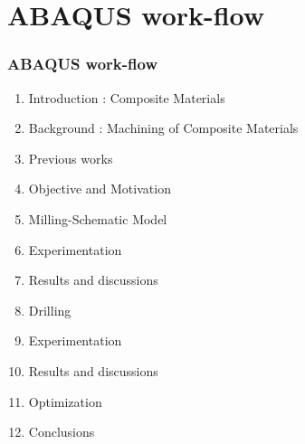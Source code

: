 \section{ABAQUS work-flow}
\begin{frame}
	\frametitle{ABAQUS work-flow}
	\begin{enumerate}
		\item Introduction : Composite Materials
		\item Background : Machining of Composite Materials
		\item Previous works
		\item Objective and Motivation
		\item Milling-Schematic Model
		\item Experimentation
		\item Results and discussions
		\item Drilling
		\item Experimentation
		\item Results and discussions
		\item Optimization
		\item Conclusions
	\end{enumerate}
\end{frame}